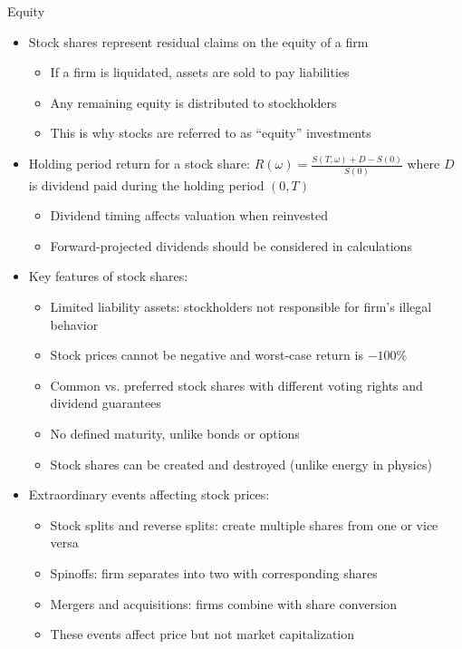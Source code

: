 \documentclass[10pt,handout]{beamer}
\newcommand{\ds}{\displaystyle}
\begin{document}
\begin{frame}{Equity}
  \begin{itemize}[<+->]
    \item Stock shares represent residual claims on the equity of a firm
      \begin{itemize}
        \item If a firm is liquidated, assets are sold to pay liabilities
        \item Any remaining equity is distributed to stockholders
        \item This is why stocks are referred to as ``equity'' investments
      \end{itemize}
    \item Holding period return for a stock share: $\ds R(\omega) = \tfrac{S(T, \omega) + D - S(0)}{S(0)}$ where $D$ is dividend paid during the holding period $(0, T)$
      \begin{itemize}
        \item Dividend timing affects valuation when reinvested
        \item Forward-projected dividends should be considered in calculations
      \end{itemize}
    \item Key features of stock shares:
      \begin{itemize}
        \item Limited liability assets: stockholders not responsible for firm's illegal behavior
        \item Stock prices cannot be negative and worst-case return is $-100\%$
        \item Common vs. preferred stock shares with different voting rights and dividend guarantees
        \item No defined maturity, unlike bonds or options
        \item Stock shares can be created and destroyed (unlike energy in physics)
      \end{itemize}
    \item Extraordinary events affecting stock prices:
      \begin{itemize}
        \item Stock splits and reverse splits: create multiple shares from one or vice versa
        \item Spinoffs: firm separates into two with corresponding shares
        \item Mergers and acquisitions: firms combine with share conversion
        \item These events affect price but not market capitalization
      \end{itemize}
  \end{itemize}
\end{frame}
\end{document}
